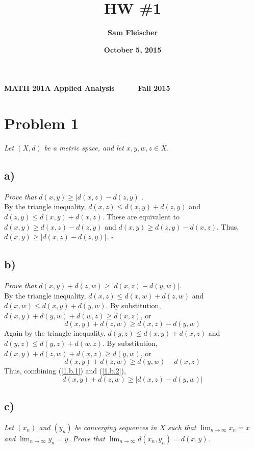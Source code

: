 \documentclass[12pt]{article}
\title{\bf HW \#1}
\author{\bf Sam Fleischer}
\date{\bf October 5, 2015}
\begin{document}
{\bf MATH 201A \hfill Applied Analysis \ \ \ \ \ \hfill Fall 2015} 

{\let\newpage\relax\maketitle}

\section*{Problem 1}
{\it Let $(X,d)$ be a metric space, and let $x, y, w, z \in X$.}

\subsection*{ a)}
{\it Prove that $d(x, y) \geq |d(x, z) - d(z, y)|$.} \\

By the triangle inequality, $d(x, z) \leq d(x, y) + d(z, y)$ and $d(z, y) \leq d(x, y) + d(x, z)$.  These are equivalent to $d(x, y) \geq d(x, z) - d(z, y)$ and $d(x, y) \geq d(z, y) - d(x, z)$.  Thus, $d(x, y) \geq |d(x, z) - d(z, y)|$. \hfill $\square$

\subsection*{ b)}
{\it Prove that $d(x, y) + d(z, w) \geq |d(x, z) - d(y, w)|$.} \\

By the triangle inequality, $d(x, z) \leq d(x, w) + d(z, w)$ and $d(x, w) \leq d(x, y) + d(y, w)$.  By substitution, $d(x, y) + d(y, w) + d(w, z) \geq d(x, z)$, or
\begin{equation}
	d(x, y) + d(z, w) \geq d(x, z) - d(y, w)
	\label{1.b.1}
\end{equation}
Again by the triangle inequality, $d(y, z) \leq d(x, y) + d(x, z)$ and $d(y, z) \leq d(y, z) + d(w, z)$.  By substitution, $d(x, y) + d(z, w) + d(x, z) \geq d(y, w)$, or
\begin{equation}
	d(x, y) + d(z, w) \geq d(y, w) - d(x, z)
	\label{1.b.2}
\end{equation}
Thus, combining (\ref{1.b.1}) and (\ref{1.b.2}),
\begin{equation}
	d(x, y) + d(z, w) \geq |d(x, z) - d(y, w)|
\end{equation}

\subsection*{ c)}
{\it Let $(x_n)$ and $(y_n)$ be converging sequences in $X$ such that $\lim_{n\rightarrow\infty} x_n = x$ and $\lim_{n\rightarrow\infty} y_n = y$.  Prove that $\lim_{n\rightarrow\infty}d(x_n, y_n) = d(x, y)$.} \\
\end{document}
